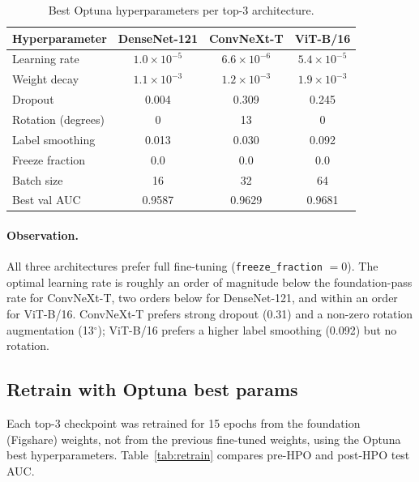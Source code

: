 \documentclass[11pt,twocolumn]{article}
\newcommand{\AUC}{AUC}
\begin{document}
\begin{table}[t]
  \centering
  \caption{Best Optuna hyperparameters per top-3 architecture.}
  \label{tab:hpo}
  \begin{tabular}{lccc}
    \toprule
    Hyperparameter & DenseNet-121 & ConvNeXt-T & ViT-B/16 \\
    \midrule
    Learning rate         & $1.0{\times}10^{-5}$ & $6.6{\times}10^{-6}$ & $5.4{\times}10^{-5}$ \\
    Weight decay          & $1.1{\times}10^{-3}$ & $1.2{\times}10^{-3}$ & $1.9{\times}10^{-3}$ \\
    Dropout               & 0.004                & 0.309                 & 0.245 \\
    Rotation (degrees)    & 0                    & 13                    & 0 \\
    Label smoothing       & 0.013                & 0.030                 & 0.092 \\
    Freeze fraction       & 0.0                  & 0.0                   & 0.0 \\
    Batch size            & 16                   & 32                    & 64 \\
    \midrule
    Best val \AUC{}       & 0.9587               & 0.9629                & 0.9681 \\
    \bottomrule
  \end{tabular}
\end{table}

\paragraph{Observation.}
All three architectures prefer full fine-tuning (\texttt{freeze\_fraction}
$= 0$). The optimal learning rate is roughly an order of magnitude below
the foundation-pass rate for ConvNeXt-T, two orders below for
DenseNet-121, and within an order for ViT-B/16. ConvNeXt-T prefers strong
dropout (0.31) and a non-zero rotation augmentation (13$^\circ$); ViT-B/16
prefers a higher label smoothing (0.092) but no rotation.

\subsection{Retrain with Optuna best params}

Each top-3 checkpoint was retrained for 15 epochs from the foundation
(Figshare) weights, not from the previous fine-tuned weights, using the
Optuna best hyperparameters. Table~\ref{tab:retrain} compares pre-HPO and
post-HPO test \AUC{}.
\end{document}
